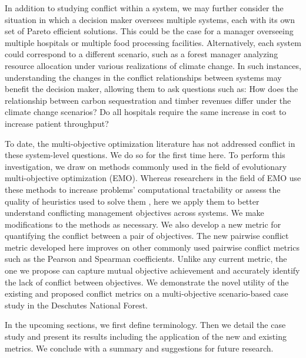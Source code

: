 In addition to studying conflict within a system, we may further consider the situation in which a decision maker oversees multiple systems, each with its own set of Pareto efficient solutions. This could be the case for a manager overseeing multiple hospitals or multiple food processing facilities. Alternatively, each system could correspond to a different scenario, such as a forest manager analyzing resource allocation under various realizations of climate change. In such instances, understanding the changes in the conflict relationships between systems may benefit the decision maker, allowing them to ask questions such as: How does the relationship between carbon sequestration and timber revenues differ under the climate change scenarios? Do all hospitals require the same increase in cost to increase patient throughput?

To date, the multi-objective optimization literature has not addressed conflict in these system-level questions. We do so for the first time here. To perform this investigation, we draw on methods commonly used in the field of evolutionary multi-objective optimization (EMO). Whereas researchers in the field of EMO use these methods to increase problems' computational tractability \cite{brockhoff2006all} or assess the quality of heuristics used to solve them \cite{zitzler2003performance}, here we apply them to better understand conflicting management objectives across systems. We make modifications to the methods as necessary. We also develop a new metric for quantifying the conflict between a pair of objectives. The new pairwise conflict metric developed here improves on other commonly used pairwise conflict metrics such as the Pearson and Spearman coefficients. Unlike any current metric, the one we propose can capture mutual objective achievement and accurately identify the lack of conflict between objectives. We demonstrate the novel utility of the existing and proposed conflict metrics on a multi-objective scenario-based case study in the Deschutes National Forest.

In the upcoming sections, we first define terminology. Then we detail the case study and present its results including the application of the new and existing metrics. We conclude with a summary and suggestions for future research.